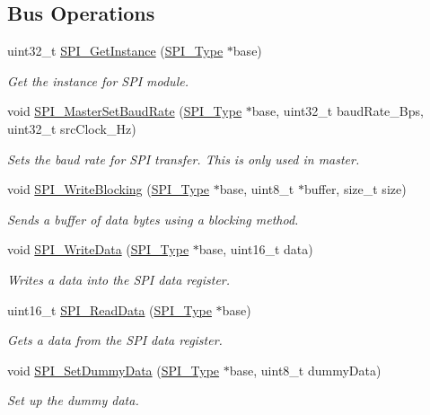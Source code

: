 \subsection*{Bus Operations}
\begin{DoxyCompactItemize}
\item 
uint32\+\_\+t \mbox{\hyperlink{group__spi__driver_gad823d00c394f6ca35c391dc178a25334}{S\+P\+I\+\_\+\+Get\+Instance}} (\mbox{\hyperlink{struct_s_p_i___type}{S\+P\+I\+\_\+\+Type}} $\ast$base)
\begin{DoxyCompactList}\small\item\em Get the instance for S\+PI module. \end{DoxyCompactList}\item 
void \mbox{\hyperlink{group__spi__driver_ga3ebe045018782edb3624026795d6269a}{S\+P\+I\+\_\+\+Master\+Set\+Baud\+Rate}} (\mbox{\hyperlink{struct_s_p_i___type}{S\+P\+I\+\_\+\+Type}} $\ast$base, uint32\+\_\+t baud\+Rate\+\_\+\+Bps, uint32\+\_\+t src\+Clock\+\_\+\+Hz)
\begin{DoxyCompactList}\small\item\em Sets the baud rate for S\+PI transfer. This is only used in master. \end{DoxyCompactList}\item 
void \mbox{\hyperlink{group__spi__driver_gae28a41ba015e3bc92936459f83500cd0}{S\+P\+I\+\_\+\+Write\+Blocking}} (\mbox{\hyperlink{struct_s_p_i___type}{S\+P\+I\+\_\+\+Type}} $\ast$base, uint8\+\_\+t $\ast$buffer, size\+\_\+t size)
\begin{DoxyCompactList}\small\item\em Sends a buffer of data bytes using a blocking method. \end{DoxyCompactList}\item 
void \mbox{\hyperlink{group__spi__driver_ga74d8732386a607c263bd16c8294b08d6}{S\+P\+I\+\_\+\+Write\+Data}} (\mbox{\hyperlink{struct_s_p_i___type}{S\+P\+I\+\_\+\+Type}} $\ast$base, uint16\+\_\+t data)
\begin{DoxyCompactList}\small\item\em Writes a data into the S\+PI data register. \end{DoxyCompactList}\item 
uint16\+\_\+t \mbox{\hyperlink{group__spi__driver_gaf23d3779b122e78fc07562bf5dbf3ac3}{S\+P\+I\+\_\+\+Read\+Data}} (\mbox{\hyperlink{struct_s_p_i___type}{S\+P\+I\+\_\+\+Type}} $\ast$base)
\begin{DoxyCompactList}\small\item\em Gets a data from the S\+PI data register. \end{DoxyCompactList}\item 
void \mbox{\hyperlink{group__spi__driver_gaa381d274dba2ce9257cdf4be5ec17662}{S\+P\+I\+\_\+\+Set\+Dummy\+Data}} (\mbox{\hyperlink{struct_s_p_i___type}{S\+P\+I\+\_\+\+Type}} $\ast$base, uint8\+\_\+t dummy\+Data)
\begin{DoxyCompactList}\small\item\em Set up the dummy data. \end{DoxyCompactList}\end{DoxyCompactItemize}
